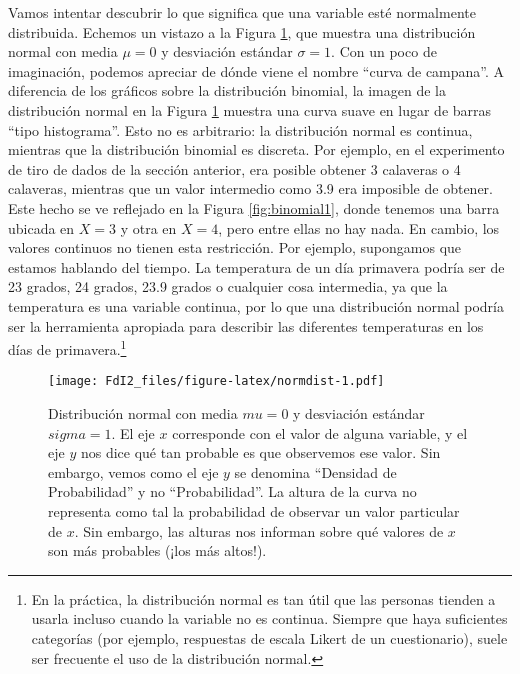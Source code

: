 \documentclass[spanish,]{book}
\let\rmarkdownfootnote\footnote%
\def\footnote{\protect\rmarkdownfootnote}
\begin{document}
Vamos intentar descubrir lo que significa que una variable esté
normalmente distribuida. Echemos un vistazo a la Figura
\ref{fig:normdist}, que muestra una distribución normal con media
\(\mu = 0\) y desviación estándar \(\sigma = 1\). Con un poco de
imaginación, podemos apreciar de dónde viene el nombre ``curva de
campana''. A diferencia de los gráficos sobre la distribución binomial,
la imagen de la distribución normal en la Figura \ref{fig:normdist}
muestra una curva suave en lugar de barras ``tipo histograma''. Esto no
es arbitrario: la distribución normal es continua, mientras que la
distribución binomial es discreta. Por ejemplo, en el experimento de
tiro de dados de la sección anterior, era posible obtener 3 calaveras o
4 calaveras, mientras que un valor intermedio como 3.9 era imposible de
obtener. Este hecho se ve reflejado en la Figura \ref{fig:binomial1},
donde tenemos una barra ubicada en \(X=3\) y otra en \(X=4\), pero entre
ellas no hay nada. En cambio, los valores continuos no tienen esta
restricción. Por ejemplo, supongamos que estamos hablando del tiempo. La
temperatura de un día primavera podría ser de 23 grados, 24 grados, 23.9
grados o cualquier cosa intermedia, ya que la temperatura es una
variable continua, por lo que una distribución normal podría ser la
herramienta apropiada para describir las diferentes temperaturas en los
días de primavera.\footnote{En la práctica, la distribución normal es
  tan útil que las personas tienden a usarla incluso cuando la variable
  no es continua. Siempre que haya suficientes categorías (por ejemplo,
  respuestas de escala Likert de un cuestionario), suele ser frecuente
  el uso de la distribución normal.}

\begin{figure}
\centering
\texttt{[image: FdI2\_files/figure-latex/normdist-1.pdf]}
\caption{\label{fig:normdist} Distribución normal con media \(mu = 0\) y
desviación estándar \(sigma = 1\). El eje \(x\) corresponde con el valor
de alguna variable, y el eje \(y\) nos dice qué tan probable es que
observemos ese valor. Sin embargo, vemos como el eje \(y\) se denomina
``Densidad de Probabilidad'' y no ``Probabilidad''. La altura de la
curva no representa como tal la probabilidad de observar un valor
particular de \(x\). Sin embargo, las alturas nos informan sobre qué
valores de \(x\) son más probables (¡los más altos!).}
\end{figure}
\end{document}
